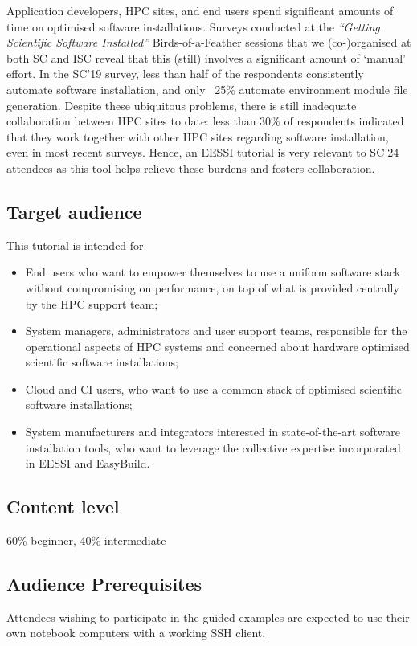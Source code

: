 Application developers, HPC sites, and end users %
spend significant amounts of time on optimised software installations. Surveys conducted at the
\emph{``Getting Scientific Software Installed''} Birds-of-a-Feather sessions that we (co-)organised at both SC and ISC
reveal that this (still) involves a significant amount of `manual' effort.
In the SC'19 survey,
less than half of the respondents consistently automate software installation,
and only ~25\% automate environment module file generation.
Despite these ubiquitous problems,
there is still inadequate collaboration
between HPC sites to date: less than 30\% of respondents indicated that they
work together with other HPC sites regarding software installation, even in most recent surveys.
Hence, an EESSI tutorial is very relevant to SC'24 attendees as this tool helps relieve these burdens and fosters
collaboration.

\subsection*{Target audience}
This tutorial is intended for
\begin{itemize}
    \item End users who want to empower themselves to use a uniform software stack without compromising on
          performance, on top of what is provided centrally by the HPC support team;
    \item System managers, administrators and user support teams, responsible for the operational aspects of HPC systems and concerned about
          hardware optimised scientific software installations;
    \item Cloud and CI users, who want to use a common stack of optimised scientific software installations;
    \item System manufacturers and integrators interested in state-of-the-art software installation tools, who want to
          leverage the collective expertise incorporated in EESSI and EasyBuild.
\end{itemize}

\subsection*{Content level}
60\% beginner, 40\% intermediate

\subsection*{Audience Prerequisites}
Attendees wishing to participate in the guided examples are expected to use their
own notebook computers with a working SSH client.

